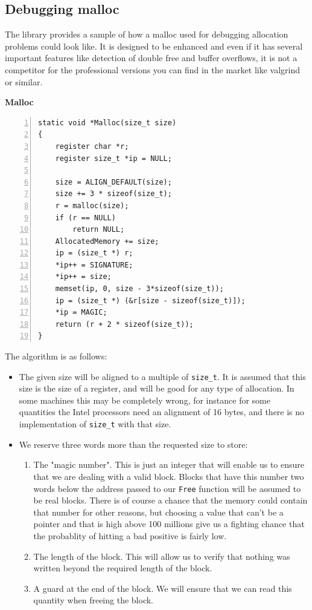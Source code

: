 \documentclass[12pt,a4paper]{memoir} %
\newif\iftth
\newcommand{\container}{}
\newcommand{\function}[1] {%
\vspace{0.2in}
\par\noindent
\textbf{#1}\index{#1!code for \container} \hrulefill
\iftth\else
\nopagebreak
\fi
\noindent\begin{Verbatim}[numbers=left, xleftmargin=7mm]}
\begin{document}
{{\subsection{Debugging malloc}
\label{Malloc}
\renewcommand{\container}{debugMalloc}
The library provides a sample of how a malloc used for debugging allocation problems could look like. It is designed to be enhanced and even if it
has several important features like detection of double free and buffer overflows, it is not a competitor for the professional versions you can find
in the market like valgrind or similar.
\function{Malloc}
static void *Malloc(size_t size)
{
    register char *r;
    register size_t *ip = NULL;

    size = ALIGN_DEFAULT(size);
    size += 3 * sizeof(size_t);
    r = malloc(size);
    if (r == NULL)
        return NULL;
    AllocatedMemory += size;
    ip = (size_t *) r;
    *ip++ = SIGNATURE;
    *ip++ = size;
    memset(ip, 0, size - 3*sizeof(size_t));
    ip = (size_t *) (&r[size - sizeof(size_t)]);
    *ip = MAGIC;
    return (r + 2 * sizeof(size_t));
}
\end{Verbatim}
The algorithm is as follows:
\begin{itemize}
\item The given size will be aligned to a multiple of \texttt{size\_t}. It is assumed that this size is the size of a register, and will be 
good for any type of allocation. In some machines this may be completely wrong, for instance for some quantities the Intel processors need an
alignment of 16 bytes, and there is no implementation of \texttt{size\_t} with that size.
\item We reserve three words more than the requested size to store:
\begin{enumerate}
\item The "magic number". This is just an integer that will enable us to ensure that we are dealing with a valid block. Blocks that have this number two 
words below the address passed to our \texttt{Free} function will be assumed to be real blocks. There 
is of course a chance that the memory
could contain that number for other reasons, but choosing a value that can't be a pointer and that is high above 100 millions give us a fighting chance 
that the
probablity of hitting a bad positive is fairly low.
\item The length of the block. This will allow us to verify that nothing was written beyond the required length of the block.
\item A guard at the end of the block. We will ensure that we can read this quantity when freeing the block.

\end{enumerate}
\end{itemize}}}
\end{document}
